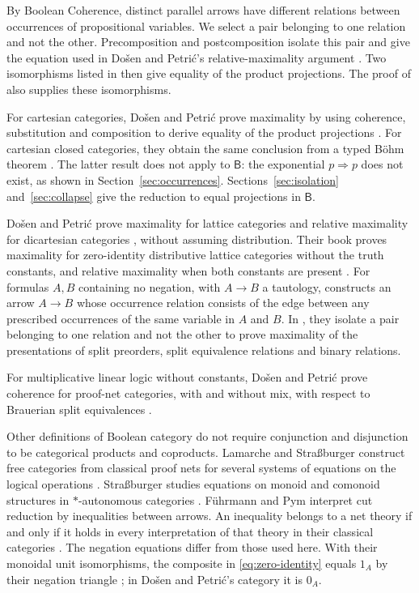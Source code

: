 \documentclass[11pt]{article}
\newcommand{\B}{\mathsf B}
\begin{document}
By Boolean Coherence, distinct parallel arrows have different
relations between occurrences of propositional variables. We select
a pair belonging to one relation and not the other. Precomposition
and postcomposition isolate this pair and give the equation used in
Do\v{s}en and Petri\'c's relative-maximality argument
\cite[\S9.7, pp.~215--216]{DP}. Two isomorphisms listed in
\cite[\S12.5, p.~294]{DP} then give equality of the product projections.
The proof of \cite[Lemma~7]{DPIsomorphic} also supplies these
isomorphisms.

For cartesian categories, Do\v{s}en and Petri\'c prove maximality by
using coherence, substitution and composition to derive equality of
the product projections \cite[\S5]{DPCartesian}.
For cartesian closed categories, they obtain the same conclusion
from a typed B\"ohm theorem \cite[\S11]{DPCCC}.
The latter result does not apply to $\B$: the exponential
$p\Rightarrow p$ does not exist, as shown in
Section~\ref{sec:occurrences}. Sections~\ref{sec:isolation}
and~\ref{sec:collapse} give the reduction to equal projections in $\B$.

Do\v{s}en and Petri\'c prove maximality for lattice categories
and relative maximality for dicartesian categories
\cite[\S\S8--10]{DPBicartesian}, without assuming distribution.
Their book proves maximality for zero-identity distributive lattice
categories without the truth constants, and relative maximality
when both constants are present \cite[\S12.5, p.~292]{DP}.
For formulas $A,B$ containing no negation, with $A\to B$ a
tautology, \cite[Lemma~6]{DPIsomorphic} constructs an arrow
$A\to B$ whose occurrence relation consists of the edge between
any prescribed occurrences of the same variable in $A$ and $B$.
In \cite[\S16]{DPSplit}, they isolate a pair belonging to one relation
and not the other to prove maximality of the presentations of split
preorders, split equivalence relations and binary relations.

For multiplicative linear logic without constants, Do\v{s}en and
Petri\'c prove coherence for proof-net categories, with and without
mix, with respect to Brauerian split equivalences \cite{DPPN}.

Other definitions of Boolean category do not require conjunction and
disjunction to be categorical products and coproducts. Lamarche and Stra{\ss}burger
construct free categories from classical proof nets for several
systems of equations on the logical operations \cite[Theorem~3.5.4]{LSFree}.
Stra{\ss}burger studies equations on monoid and comonoid structures
in $*$-autonomous categories \cite{Strassburger}.
F\"uhrmann and Pym interpret cut reduction by inequalities between
arrows. An inequality belongs to a net theory if and only if it
holds in every interpretation of that theory in their classical
categories \cite[Theorems~6.4--6.5]{FP}.
The negation equations differ from those used here.
With their monoidal unit isomorphisms, the composite in
\eqref{eq:zero-identity} equals $1_A$ by their negation triangle
\cite[(11)]{FP}; in Do\v{s}en and Petri\'c's category it is $0_A$.
\end{document}
